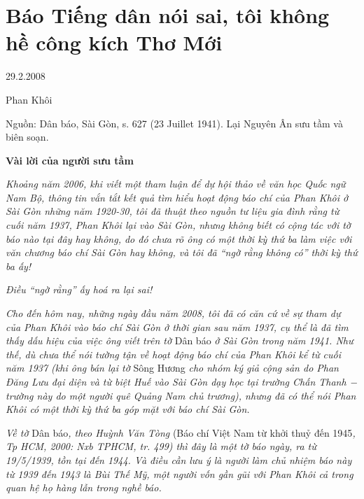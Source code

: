 \documentclass[../main.tex]{subfiles}
\begin{document}
\chapter{Báo Tiếng dân nói sai, tôi không hề công kích Thơ Mới}

\begin{metadata}

\begin{flushright}29.2.2008\end{flushright}

Phan Khôi

Nguồn: Dân báo, Sài Gòn, s. 627 (23 Juillet 1941). Lại Nguyên Ân sưu tầm và biên soạn.

\end{metadata}

\begin{multicols}{2}

\textbf{Vài lời của người sưu tầm} 
 
\textit{Khoảng năm 2006, khi viết một tham luận để dự hội thảo về văn học Quốc ngữ Nam Bộ, thông tin vắn tắt kết quả tìm hiểu hoạt động báo chí của Phan Khôi ở Sài Gòn những năm 1920-30, tôi đã thuật theo nguồn tư liệu gia đình rằng từ cuối năm 1937, Phan Khôi lại vào Sài Gòn, nhưng không biết có cộng tác với tờ báo nào tại đây hay không, do đó chưa rõ ông có một thời kỳ thứ ba làm việc với văn chương báo chí Sài Gòn hay không, và tôi đã “ngờ rằng không có” thời kỳ thứ ba ấy! } 
 
\textit{Điều “ngờ rằng” ấy hoá ra lại sai!} 
 
\textit{Cho đến hôm nay, những ngày đầu năm 2008, tôi đã có căn cứ về sự tham dự của Phan Khôi vào báo chí Sài Gòn ở thời gian sau năm 1937, cụ thể là đã tìm thấy dấu hiệu của việc ông viết trên tờ  }Dân báo\textit{ ở Sài Gòn trong năm 1941. Như thế, dù chưa thể nói tường tận về hoạt động báo chí của Phan Khôi kể từ cuối năm 1937 (khi ông bán lại tờ }Sông Hương\textit{ cho nhóm ký giả cộng sản do Phan Đăng Lưu đại diện và từ biệt Huế vào Sài Gòn dạy học tại trường Chấn Thanh − trường này do một người quê Quảng Nam chủ trương), nhưng đã có thể nói Phan Khôi có một thời kỳ thứ ba góp mặt với báo chí Sài Gòn.} 
 
\textit{Về tờ  }Dân báo\textit{, theo Huỳnh Văn Tòng }(Báo chí Việt Nam từ khởi thuỷ đến 1945\textit{, Tp HCM, 2000: Nxb TPHCM, tr. 499) thì đây là một tờ báo ngày, ra từ  19/5/1939, tồn tại đến 1944. Và điều cần lưu ý là người làm chủ nhiệm báo này từ 1939 đến 1943 là Bùi Thế Mỹ, một người vốn gần gũi với Phan Khôi cả trong quan hệ họ hàng lẫn trong nghề báo. } 
 

\end{multicols}
\end{document}
